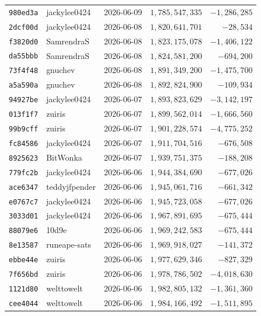 {\begin{longtable}{@{}lllrr@{}}
\texttt{980ed3a} & jackylee0424 & 2026-06-09 & $1{,}785{,}547{,}335$ & $-1{,}286{,}285$\\
\texttt{2dcf00d} & jackylee0424 & 2026-06-08 & $1{,}820{,}641{,}701$ & $-28{,}534$\\
\texttt{f3820d0} & SamrendraS & 2026-06-08 & $1{,}823{,}175{,}078$ & $-1{,}406{,}122$\\
\texttt{da55bbb} & SamrendraS & 2026-06-08 & $1{,}824{,}581{,}200$ & $-694{,}200$\\
\texttt{73f4f48} & gnuchev & 2026-06-08 & $1{,}891{,}349{,}200$ & $-1{,}475{,}700$\\
\texttt{a5a590a} & gnuchev & 2026-06-08 & $1{,}892{,}824{,}900$ & $-109{,}934$\\
\texttt{94927be} & jackylee0424 & 2026-06-07 & $1{,}893{,}823{,}629$ & $-3{,}142{,}197$\\
\texttt{013f1f7} & zuiris & 2026-06-07 & $1{,}899{,}562{,}014$ & $-1{,}666{,}560$\\
\texttt{99b9cff} & zuiris & 2026-06-07 & $1{,}901{,}228{,}574$ & $-4{,}775{,}252$\\
\texttt{fc84586} & jackylee0424 & 2026-06-07 & $1{,}911{,}704{,}516$ & $-676{,}508$\\
\texttt{8925623} & BitWonka & 2026-06-07 & $1{,}939{,}751{,}375$ & $-188{,}208$\\
\texttt{779fc2b} & jackylee0424 & 2026-06-06 & $1{,}944{,}384{,}690$ & $-677{,}026$\\
\texttt{ace6347} & teddyjfpender & 2026-06-06 & $1{,}945{,}061{,}716$ & $-661{,}342$\\
\texttt{e0767c7} & jackylee0424 & 2026-06-06 & $1{,}945{,}723{,}058$ & $-677{,}026$\\
\texttt{3033d01} & jackylee0424 & 2026-06-06 & $1{,}967{,}891{,}695$ & $-675{,}444$\\
\texttt{88079e6} & 10d9e & 2026-06-06 & $1{,}969{,}242{,}583$ & $-675{,}444$\\
\texttt{8e13587} & runeape-sats & 2026-06-06 & $1{,}969{,}918{,}027$ & $-141{,}372$\\
\texttt{ebbe44e} & zuiris & 2026-06-06 & $1{,}977{,}629{,}346$ & $-827{,}329$\\
\texttt{7f656bd} & zuiris & 2026-06-06 & $1{,}978{,}786{,}502$ & $-4{,}018{,}630$\\
\texttt{1121d80} & welttowelt & 2026-06-06 & $1{,}982{,}805{,}132$ & $-1{,}361{,}360$\\
\texttt{cee4044} & welttowelt & 2026-06-06 & $1{,}984{,}166{,}492$ & $-1{,}511{,}895$\\

\end{longtable}}
